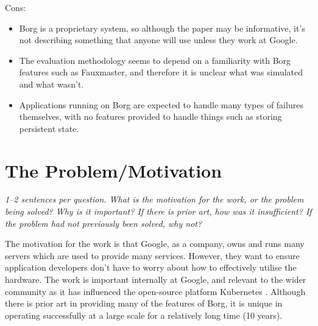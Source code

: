 \documentclass[11pt]{article}
\begin{document}
Cons:

\begin{itemize}

    \item Borg is a proprietary system, so although the paper may be
    informative, it's not describing something that anyone will use unless they
    work at Google.

    \item The evaluation methodology seems to depend on a familiarity with Borg
    features such as Fauxmaster, and therefore it is unclear what was simulated
    and what wasn't.

    \item Applications running on Borg are expected to handle many types of
    failures themselves, with no features provided to handle things such as
    storing persistent state.


\end{itemize}

\section*{The Problem/Motivation}

\textsl{1--2 sentences per question. What is the motivation for the work, or
the problem being solved? Why is it important? If there is prior art, how was
it insufficient? If the problem had not previously been solved, why not?}

The motivation for the work is that Google, as a company, owns and runs many
servers which are used to provide many services. However, they want to ensure
application developers don't have to worry about how to effectively utilise the
hardware. The work is important internally at Google, and relevant to the wider
community as it has influenced the open-source platform Kubernetes
\cite{Kubernetes}. Although there is prior art in providing many of the
features of Borg, it is unique in operating successfully at a large scale for a
relatively long time (10 years).
\end{document}
